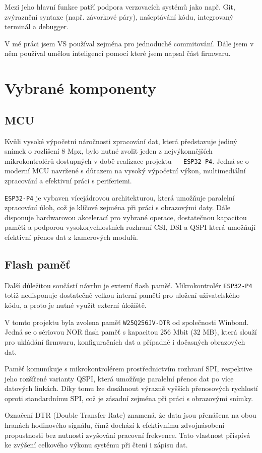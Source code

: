 \documentclass[12pt, a4paper, oneside]{report}
\begin{document}
Mezi jeho hlavní funkce patří podpora verzovacích systémů jako např. Git, zvýraznění syntaxe (např. závorkové páry), našeptávání kódu, integrovaný terminál a debugger.

V mé práci jsem VS používal zejména pro jednoduché commitování. Dále jsem v něm používal umělou inteligenci pomocí které jsem napsal část firmwaru. 
\chapter{Vybrané komponenty}
\section{MCU}
Kvůli vysoké výpočetní náročnosti zpracování dat, která představuje jediný snímek o rozlišení 8 Mpx, bylo nutné zvolit jeden z nejvýkonnějších mikrokontrolérů dostupných v době realizace projektu — \texttt{ESP32-P4}. Jedná se o moderní MCU navržené s důrazem na vysoký výpočetní výkon, multimediální zpracování a efektivní práci s periferiemi.

\texttt{ESP32-P4} je vybaven vícejádrovou architekturou, která umožňuje paralelní zpracování úloh, což je klíčové zejména při práci s obrazovými daty. Dále disponuje hardwarovou akcelerací pro vybrané operace, dostatečnou kapacitou paměti a podporou vysokorychlostních rozhraní CSI, DSI a QSPI která umožňují efektivní přenos dat z kamerových modulů.

\section{Flash paměť}
Další důležitou součástí návrhu je externí flash paměť. Mikrokontrolér \texttt{ESP32-P4} totiž nedisponuje dostatečně velkou interní pamětí pro uložení uživatelského kódu, a proto je nutné využít externí úložiště.

V tomto projektu byla zvolena paměť \texttt{W25Q256JV-DTR} od společnosti Winbond. Jedná se o sériovou NOR flash paměť s kapacitou 256 Mbit (32 MB), která slouží pro ukládání firmwaru, konfiguračních dat a případně i dočasných obrazových dat.

Paměť komunikuje s mikrokontrolérem prostřednictvím rozhraní SPI, respektive jeho rozšířené varianty QSPI, která umožňuje paralelní přenos dat po více datových linkách. Díky tomu lze dosáhnout výrazně vyšších přenosových rychlostí oproti standardnímu SPI, což je zásadní zejména při práci s obrazovými snímky.

Označení DTR (Double Transfer Rate) znamená, že data jsou přenášena na obou hranách hodinového signálu, čímž dochází k efektivnímu zdvojnásobení propustnosti bez nutnosti zvyšování pracovní frekvence. Tato vlastnost přispívá ke zvýšení celkového výkonu systému při čtení i zápisu dat.
\end{document}
